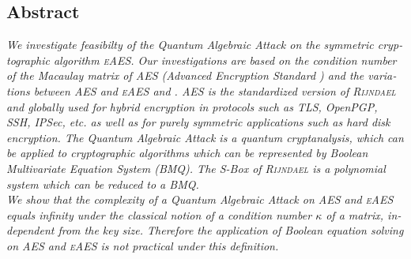 \documentclass[a4paper,11pt]{article}
\begin{document}
\begin{otherlanguage}{english}

\vspace{3mm}



\section{Abstract}

\noindent
\textit{We investigate feasibilty of the Quantum Algebraic Attack \cite{QAA} on the symmetric cryptographic algorithm \textsc{eAES}. Our investigations are based on the condition number of the Macaulay matrix of  \textsc{AES} (Advanced Encryption Standard \cite{AES}) and the variations between \textsc{AES} and \textsc{eAES} and . \textsc{AES} is the standardized version of \textsc{Rijndael} and globally used for hybrid encryption in protocols such as TLS, OpenPGP, SSH, IPSec, etc. as well as for purely symmetric applications such as hard disk encryption. The Quantum Algebraic Attack is a quantum cryptanalysis, which can be applied to cryptographic algorithms which can be represented by Boolean Multivariate Equation System (BMQ). The S-Box of \textsc{Rijndael} is a polynomial system which can be reduced to a BMQ.} \\

\noindent
\textit{We show that the complexity of a Quantum Algebraic Attack on \textsc{AES} and \textsc{eAES} equals infinity under the classical notion of a condition number $\kappa$ of a matrix, independent from the key size. Therefore the application of Boolean equation solving \cite{QAA} on \textsc{AES} and \textsc{eAES} is not practical under this definition. } \\


\end{otherlanguage}
\end{document}
